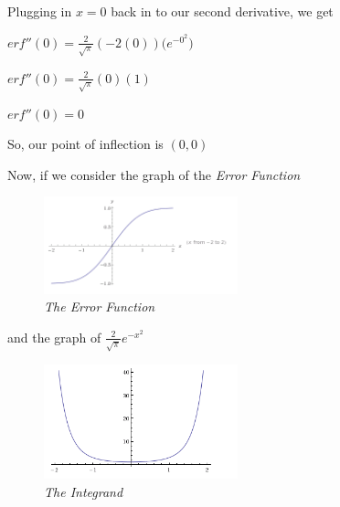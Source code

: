 \documentclass[12pt, executivepaper]{article}
\begin{document}
\begin{flushleft}
Plugging in $x=0$ back in to our second derivative, we get

\begin{center}

$erf''(0)=\frac{2}{\sqrt{\pi}}(-2(0))\bigg(e^{-0^{2}}\bigg)$

\vspace{2mm}

$erf''(0)=\frac{2}{\sqrt{\pi}}(0)(1)$

\vspace{2mm}

$erf''(0)=0$

\end{center}

So, our point of inflection is $(0,0)$

\pagebreak

\vspace*{-40mm}

Now, if we consider the graph of the \textit{Error Function}

\begin{figure}[H]

\centering

\includegraphics[width=0.5\textwidth]{ErrorFunction}

\caption{\textit{The Error Function}}

\end{figure}

and the graph of $\frac{2}{\sqrt{\pi}} e^{-x^{2}}$

\begin{figure}[H]

\centering

\includegraphics[width=0.5\textwidth]{Integrand}

\caption{\textit{The Integrand}}


\end{figure}
\end{flushleft}
\end{document}
